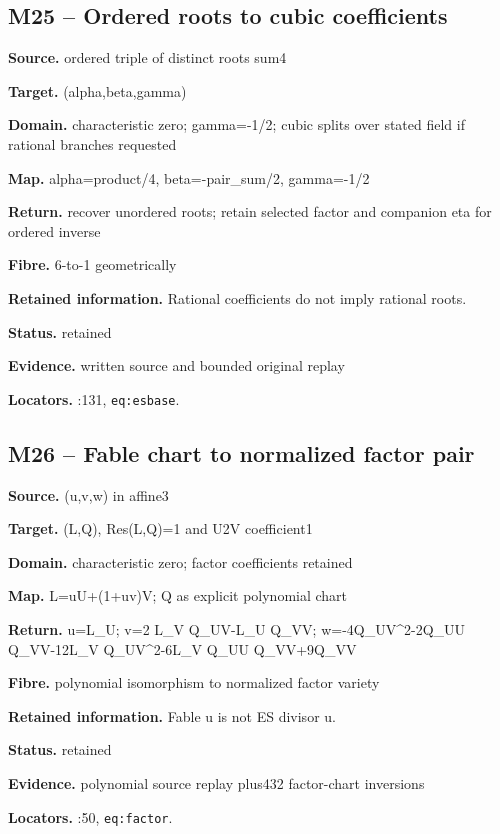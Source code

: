 \subsection*{M25 -- Ordered roots to cubic coefficients}
\noindent\textbf{Source.} ordered triple of distinct roots sum4\par
\noindent\textbf{Target.} (alpha,beta,gamma)\par
\noindent\textbf{Domain.} characteristic zero; gamma=-1/2; cubic splits over stated field if rational branches requested\par
\noindent\textbf{Map.} alpha=product/4, beta=-pair\_sum/2, gamma=-1/2\par
\noindent\textbf{Return.} recover unordered roots; retain selected factor and companion eta for ordered inverse\par
\noindent\textbf{Fibre.} 6-to-1 geometrically\par
\noindent\textbf{Retained information.} Rational coefficients do not imply rational roots.\par
\noindent\textbf{Status.} retained\par
\noindent\textbf{Evidence.} written source and bounded original replay\par
\noindent\textbf{Locators.} :131, \texttt{eq:esbase}.
\subsection*{M26 -- Fable chart to normalized factor pair}
\noindent\textbf{Source.} (u,v,w) in affine3\par
\noindent\textbf{Target.} (L,Q), Res(L,Q)=1 and U2V coefficient1\par
\noindent\textbf{Domain.} characteristic zero; factor coefficients retained\par
\noindent\textbf{Map.} L=uU+(1+uv)V; Q as explicit polynomial chart\par
\noindent\textbf{Return.} u=L\_U; v=2 L\_V Q\_UV-L\_U Q\_VV; w=-4Q\_UV\textasciicircum{}2-2Q\_UU Q\_VV-12L\_V Q\_UV\textasciicircum{}2-6L\_V Q\_UU Q\_VV+9Q\_VV\par
\noindent\textbf{Fibre.} polynomial isomorphism to normalized factor variety\par
\noindent\textbf{Retained information.} Fable u is not ES divisor u.\par
\noindent\textbf{Status.} retained\par
\noindent\textbf{Evidence.} polynomial source replay plus432 factor-chart inversions\par
\noindent\textbf{Locators.} :50, \texttt{eq:factor}.
